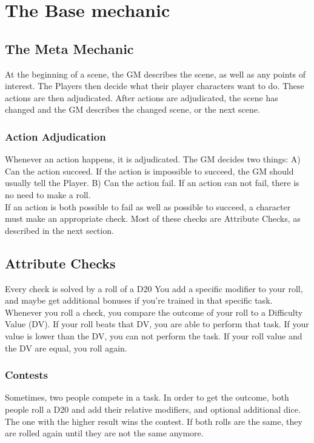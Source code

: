 \chapter{The Base mechanic}\label{ch:baseMechanic}
\section{The Meta Mechanic}\label{sec:metaMechanic}
At the beginning of a scene, the GM describes the scene, as well as any points of interest.
The Players then decide what their player characters want to do.
These actions are then adjudicated.
After actions are adjudicated, the scene has changed and the GM describes the changed scene, or the next scene.

\subsection{Action Adjudication}\label{subsec:actionAdjudication}
Whenever an action happens, it is adjudicated.
The GM decides two things: A) Can the action succeed.
If the action is impossible to succeed, the GM should usually tell the Player.
B) Can the action fail.
If an action can not fail, there is no need to make a roll.\\
If an action is both possible to fail as well as possible to succeed, a character must make an appropriate check.
Most of these checks are Attribute Checks, as described in the next section.\\

\section{Attribute Checks}\label{sec:attributeChecks}
Every check is solved by a roll of a D20 You add a specific modifier to your roll, and maybe get additional bonuses if you're trained in that specific task.
Whenever you roll a check, you compare the outcome of your roll to a Difficulty Value (DV).
If your roll beats that DV, you are able to perform that task.
If your value is lower than the DV, you can not perform the task.
If your roll value and the DV are equal, you roll again.

\subsection{Contests}\label{subsec:contests}
Sometimes, two people compete in a task.
In order to get the outcome, both people roll a D20 and add their relative modifiers, and optional additional dice.
The one with the higher result wins the contest.
If both rolls are the same, they are rolled again until they are not the same anymore.


